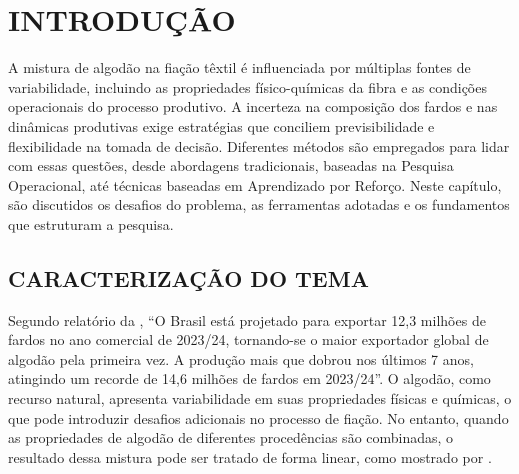 \documentclass[
    12pt,                %
    openright,           %
    oneside,             %
    a4paper,             %
    english,             %
    spanish,             %
    brazil               %
]{ufscar}
\begin{document}

\listoffigures*
\cleardoublepage


\listoftables*
\cleardoublepage

\tableofcontents*
\cleardoublepage


\textual


\chapter{INTRODUÇÃO}

A mistura de algodão na fiação têxtil é influenciada por múltiplas fontes de variabilidade, incluindo as propriedades físico-químicas da fibra e as condições operacionais do processo produtivo. A incerteza na composição dos fardos e nas dinâmicas produtivas exige estratégias que conciliem previsibilidade e flexibilidade na tomada de decisão. Diferentes métodos são empregados para lidar com essas questões, desde abordagens tradicionais, baseadas na Pesquisa Operacional, até técnicas baseadas em Aprendizado por Reforço. Neste capítulo, são discutidos os desafios do problema, as ferramentas adotadas e os fundamentos que estruturam a pesquisa.

\section{CARACTERIZAÇÃO DO TEMA}

Segundo relatório da , ``O Brasil está projetado para exportar 12,3 milhões de fardos no ano comercial de 2023/24, tornando-se o maior exportador global de algodão pela primeira vez. A produção mais que dobrou nos últimos 7 anos, atingindo um recorde de 14,6 milhões de fardos em 2023/24''. O algodão, como recurso natural, apresenta variabilidade em suas propriedades físicas e químicas, o que pode introduzir desafios adicionais no processo de fiação. No entanto, quando as propriedades de algodão de diferentes procedências são combinadas, o resultado dessa mistura pode ser tratado de forma linear, como mostrado por .
\end{document}
